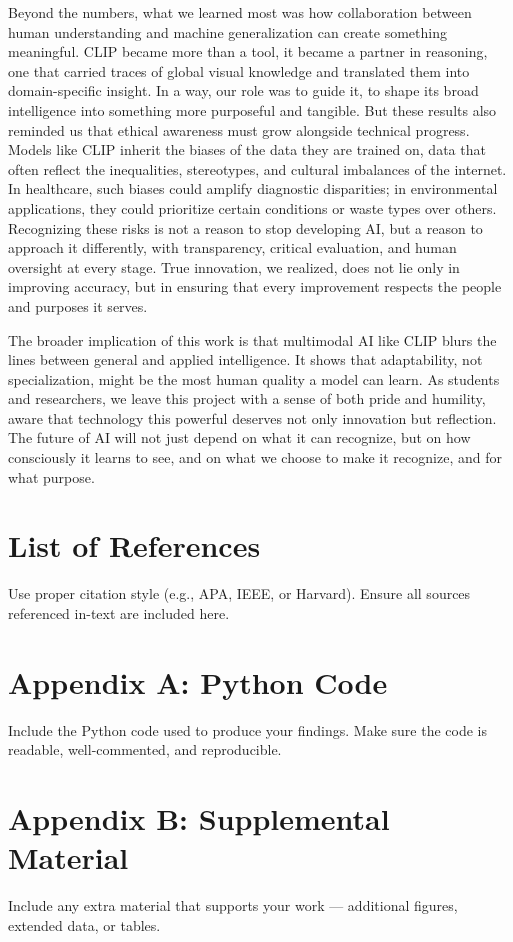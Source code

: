 \documentclass[12pt]{article}
\begin{document}
Beyond the numbers, what we learned most was how collaboration between human understanding and machine generalization can create something meaningful. CLIP became more than a tool, it became a partner in reasoning, one that carried traces of global visual knowledge and translated them into domain-specific insight. In a way, our role was to guide it, to shape its broad intelligence into something more purposeful and tangible.
But these results also reminded us that ethical awareness must grow alongside technical progress. Models like CLIP inherit the biases of the data they are trained on, data that often reflect the inequalities, stereotypes, and cultural imbalances of the internet. In healthcare, such biases could amplify diagnostic disparities; in environmental applications, they could prioritize certain conditions or waste types over others. Recognizing these risks is not a reason to stop developing AI, but a reason to approach it differently, with transparency, critical evaluation, and human oversight at every stage. True innovation, we realized, does not lie only in improving accuracy, but in ensuring that every improvement respects the people and purposes it serves.

The broader implication of this work is that multimodal AI like CLIP blurs the lines between general and applied intelligence. It shows that adaptability, not specialization, might be the most human quality a model can learn. As students and researchers, we leave this project with a sense of both pride and humility, aware that technology this powerful deserves not only innovation but reflection. The future of AI will not just depend on what it can recognize, but on how consciously it learns to see, and on what we choose to make it recognize, and for what purpose.

\newpage
\section*{List of References}
Use proper citation style (e.g., APA, IEEE, or Harvard).  
Ensure all sources referenced in-text are included here.

\appendix

\section{Appendix A: Python Code}
Include the Python code used to produce your findings.  
Make sure the code is readable, well-commented, and reproducible.

\section{Appendix B: Supplemental Material}
Include any extra material that supports your work — additional figures, extended data, or tables.
\end{document}
